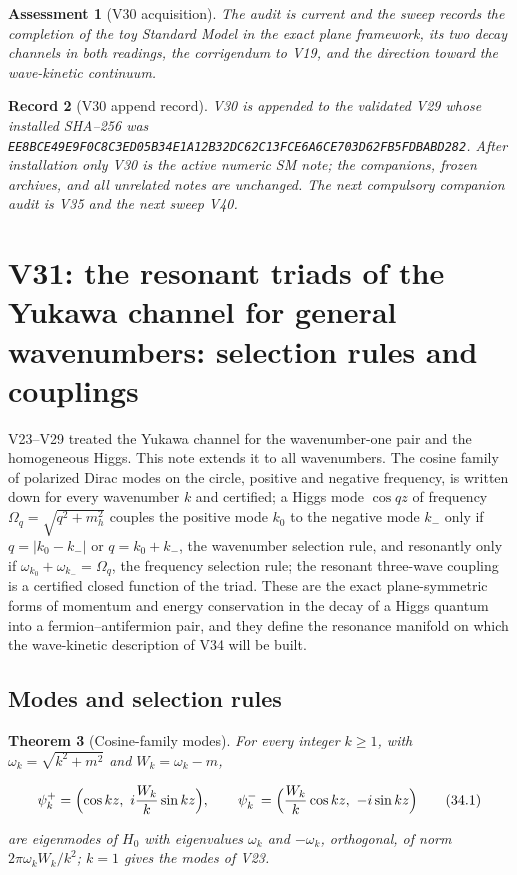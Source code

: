 \documentclass[11pt]{article}
\newtheorem{theorem}{Theorem}[section]
\newtheorem{assessment}[theorem]{Assessment}
\newtheorem{record}[theorem]{Record}
\theoremstyle{remark}
\begin{document}
\begin{assessment}[V30 acquisition]
\label{ass:v20v30}
The audit is current and the sweep records the completion of the
toy Standard Model in the exact plane framework, its two decay
channels in both readings, the corrigendum to V19, and the direction
toward the wave-kinetic continuum.
\end{assessment}

\begin{record}[V30 append record]
\label{rec:v20v30}
V30 is appended to the validated V29 whose installed SHA--256 was
\texttt{EE8BCE49E9F0C8C3ED05B34E1A12B32DC62C13FCE6A6CE703D62FB5FDBABD282}.
After installation only V30 is the active numeric SM note; the
companions, frozen archives, and all unrelated notes are unchanged.
The next compulsory companion audit is V35 and the next sweep V40.
\end{record}


\section{V31: the resonant triads of the Yukawa channel for general wavenumbers: selection rules and couplings}
\label{sec:v20v31}

V23--V29 treated the Yukawa channel for the wavenumber-one pair and
the homogeneous Higgs.  This note extends it to all wavenumbers.
The cosine family of polarized Dirac modes on the circle, positive
and negative frequency, is written down for every wavenumber \(k\)
and certified; a Higgs mode \(\cos qz\) of frequency
\(\Omega_q=\sqrt{q^2+m_h^2}\) couples the positive mode \(k_0\) to the
negative mode \(k_-\) only if \(q=|k_0-k_-|\) or \(q=k_0+k_-\), the
wavenumber selection rule, and resonantly only if
\(\omega_{k_0}+\omega_{k_-}=\Omega_q\), the frequency selection rule; the
resonant three-wave coupling is a certified closed function of the
triad.  These are the exact plane-symmetric forms of momentum and
energy conservation in the decay of a Higgs quantum into a
fermion--antifermion pair, and they define the resonance manifold
on which the wave-kinetic description of V34 will be built.

\subsection{Modes and selection rules}

\begin{theorem}[Cosine-family modes]
\label{thm:v20v31-modes}
For every integer \(k\ge1\), with \(\omega_k=\sqrt{k^2+m^2}\) and
\(W_k=\omega_k-m\),

\[
 \psi_k^+=\Bigl(\cos kz,\ i\frac{W_k}k\sin kz\Bigr),\qquad
 \psi_k^-=\Bigl(\frac{W_k}k\cos kz,\ -i\sin kz\Bigr)                   \tag{34.1}
\]

are eigenmodes of \(H_0\) with eigenvalues \(\omega_k\) and \(-\omega_k\),
orthogonal, of norm \(2\pi\omega_kW_k/k^2\); \(k=1\) gives the modes of
V23.
\end{theorem}
\end{document}
